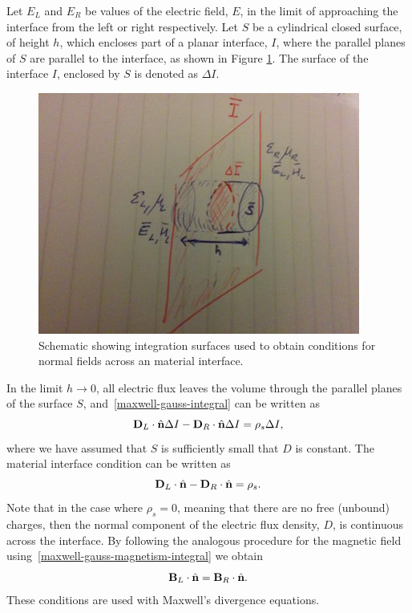 Let $E_L$ and $E_R$ be values of the electric field, $E$, in the limit of approaching the interface from the left or right respectively. Let $S$ be a cylindrical closed surface, of height $h$, which encloses part of a planar interface, $I$, where the parallel planes of $S$ are parallel to the interface, as shown in Figure \ref{fig:material-interface-derivation:E-pillbox}. The surface of the interface $I$, enclosed by $S$ is denoted as $\Delta I$.
\begin{figure}[htbp!]
\begin{center}
    \includegraphics[scale=0.9]{Figures/Chapters/PhysicalProblem/interfaceEPillBox}
\end{center}
\caption{Schematic showing integration surfaces used to obtain conditions for normal fields across an material interface.}
\label{fig:material-interface-derivation:E-pillbox}
\end{figure}
In the limit $h \to 0$, all electric flux leaves the volume through the parallel planes of the surface $S$, and~\eqref{maxwell-gauss-integral} can be written as
$$
\mathbf{D}_L \cdot \hat{\mathbf{n}} \Delta I  - \mathbf{D}_R \cdot \hat{\mathbf{n}} \Delta I = \rho_s \Delta I,
$$
where we have assumed that $S$ is sufficiently small that $D$ is constant. The material interface condition can be written as
$$
\mathbf{D}_L \cdot \hat{\mathbf{n}} - \mathbf{D}_R \cdot \hat{\mathbf{n}} = \rho_s .
$$
Note that in the case where $\rho_s = 0$, meaning that there are no free (unbound) charges, then the normal component of the electric flux density, $D$, is continuous across the interface.
By following the analogous procedure for the magnetic field using~\eqref{maxwell-gauss-magnetism-integral} we obtain
$$
\mathbf{B}_L \cdot \hat{\mathbf{n}} = \mathbf{B}_R \cdot \hat{\mathbf{n}} .
$$
These conditions are used with Maxwell's divergence equations.

